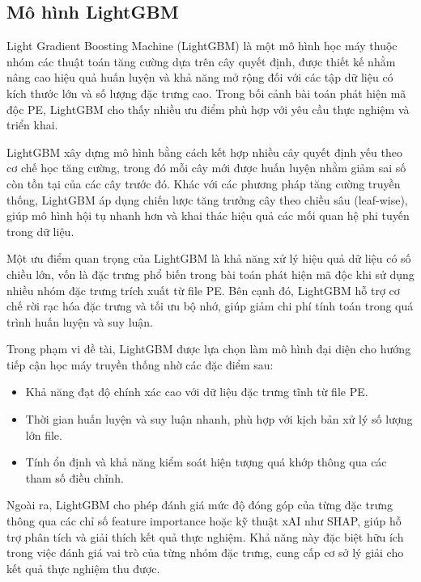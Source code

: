 \subsection{Mô hình LightGBM}

Light Gradient Boosting Machine (LightGBM) \cite{lgbm} là một mô hình học máy
thuộc nhóm các thuật toán tăng cường dựa trên cây quyết định, được
thiết kế nhằm nâng cao hiệu quả huấn luyện và khả năng mở rộng đối
với các tập dữ liệu có kích thước lớn và số lượng đặc trưng cao. Trong
bối cảnh bài toán phát hiện mã độc PE, LightGBM cho thấy nhiều ưu
điểm phù hợp với yêu cầu thực nghiệm và triển khai.

LightGBM xây dựng mô hình bằng cách kết hợp nhiều cây quyết định yếu
theo cơ chế học tăng cường, trong đó mỗi cây mới được huấn luyện nhằm
giảm sai số còn tồn tại của các cây trước đó. Khác với các phương pháp
tăng cường truyền thống, LightGBM áp dụng chiến lược tăng trưởng cây
theo chiều sâu (leaf-wise), giúp mô hình hội tụ nhanh hơn và khai thác
hiệu quả các mối quan hệ phi tuyến trong dữ liệu.

Một ưu điểm quan trọng của LightGBM là khả năng xử lý hiệu quả dữ
liệu có số chiều lớn, vốn là đặc trưng phổ biến trong bài toán phát
hiện mã độc khi sử dụng nhiều nhóm đặc trưng trích xuất từ file PE.
Bên cạnh đó, LightGBM hỗ trợ cơ chế rời rạc hóa đặc trưng và tối ưu
bộ nhớ, giúp giảm chi phí tính toán trong quá trình huấn luyện và suy
luận.

Trong phạm vi đề tài, LightGBM được lựa chọn làm mô hình đại diện cho
hướng tiếp cận học máy truyền thống nhờ các đặc điểm sau:

\begin{itemize}
    \item Khả năng đạt độ chính xác cao với dữ liệu đặc trưng tĩnh
        từ file PE.
    \item Thời gian huấn luyện và suy luận nhanh, phù hợp với kịch
        bản xử lý số lượng lớn file.
    \item Tính ổn định và khả năng kiểm soát hiện tượng quá khớp
        thông qua các tham số điều chỉnh.
\end{itemize}

Ngoài ra, LightGBM cho phép đánh giá mức độ đóng góp của từng đặc
trưng thông qua các chỉ số feature importance hoặc kỹ thuật xAI
như SHAP, giúp hỗ trợ phân tích
và giải thích kết quả thực nghiệm. Khả năng này đặc biệt hữu ích
trong việc đánh giá vai trò của từng nhóm đặc trưng, cung cấp cơ sở
lý giải cho kết quả thực nghiệm thu được.









